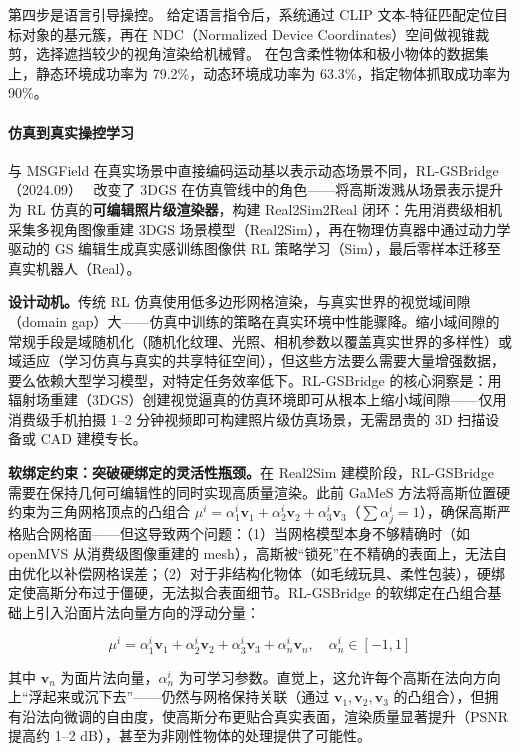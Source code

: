 第四步是语言引导操控。
给定语言指令后，系统通过 CLIP 文本-特征匹配定位目标对象的基元簇，再在 NDC（Normalized Device Coordinates）空间做视锥裁剪，选择遮挡较少的视角渲染给机械臂。
在包含柔性物体和极小物体的数据集上，静态环境成功率为 79.2\%，动态环境成功率为 63.3\%，指定物体抓取成功率为 90\%。

\paragraph{仿真到真实操控学习}

与 MSGField 在真实场景中直接编码运动基以表示动态场景不同，RL-GSBridge（2024.09）~\cite{2409_20291} 改变了 3DGS 在仿真管线中的角色——将高斯泼溅从场景表示提升为 RL 仿真的\textbf{可编辑照片级渲染器}，构建 Real2Sim2Real 闭环：先用消费级相机采集多视角图像重建 3DGS 场景模型（Real2Sim），再在物理仿真器中通过动力学驱动的 GS 编辑生成真实感训练图像供 RL 策略学习（Sim），最后零样本迁移至真实机器人（Real）。

\textbf{设计动机。}传统 RL 仿真使用低多边形网格渲染，与真实世界的视觉域间隙（domain gap）大——仿真中训练的策略在真实环境中性能骤降。缩小域间隙的常规手段是域随机化（随机化纹理、光照、相机参数以覆盖真实世界的多样性）或域适应（学习仿真与真实的共享特征空间），但这些方法要么需要大量增强数据，要么依赖大型学习模型，对特定任务效率低下。RL-GSBridge 的核心洞察是：用辐射场重建（3DGS）创建视觉逼真的仿真环境即可从根本上缩小域间隙——仅用消费级手机拍摄 1--2 分钟视频即可构建照片级仿真场景，无需昂贵的 3D 扫描设备或 CAD 建模专长。

\textbf{软绑定约束：突破硬绑定的灵活性瓶颈。}在 Real2Sim 建模阶段，RL-GSBridge 需要在保持几何可编辑性的同时实现高质量渲染。此前 GaMeS 方法将高斯位置硬约束为三角网格顶点的凸组合 $\mu^i = \alpha_1^i \mathbf{v}_1 + \alpha_2^i \mathbf{v}_2 + \alpha_3^i \mathbf{v}_3$（$\sum \alpha_j^i = 1$），确保高斯严格贴合网格面——但这导致两个问题：（1）当网格模型本身不够精确时（如 openMVS 从消费级图像重建的 mesh），高斯被``锁死''在不精确的表面上，无法自由优化以补偿网格误差；（2）对于非结构化物体（如毛绒玩具、柔性包装），硬绑定使高斯分布过于僵硬，无法拟合表面细节。RL-GSBridge 的软绑定在凸组合基础上引入沿面片法向量方向的浮动分量：

\begin{equation}
    \mu^i = \alpha_1^i \mathbf{v}_1 + \alpha_2^i \mathbf{v}_2 + \alpha_3^i \mathbf{v}_3 + \alpha_n^i \mathbf{v}_n, \quad \alpha_n^i \in [-1, 1]
\end{equation}

其中 $\mathbf{v}_n$ 为面片法向量，$\alpha_n^i$ 为可学习参数。直觉上，这允许每个高斯在法向方向上``浮起来或沉下去''——仍然与网格保持关联（通过 $\mathbf{v}_1, \mathbf{v}_2, \mathbf{v}_3$ 的凸组合），但拥有沿法向微调的自由度，使高斯分布更贴合真实表面，渲染质量显著提升（PSNR 提高约 1--2 dB），甚至为非刚性物体的处理提供了可能性。

